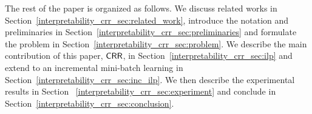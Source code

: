 The rest of the paper is organized as follows. We discuss related works in Section~\ref{interpretability_crr_sec:related_work}, introduce the notation and preliminaries in Section~\ref{interpretability_crr_sec:preliminaries} and formulate the problem in Section~\ref{interpretability_crr_sec:problem}. We describe the main contribution of this paper, $ \mathsf{CRR} $,  in Section~\ref{interpretability_crr_sec:ilp} and extend to an incremental mini-batch learning in Section~\ref{interpretability_crr_sec:inc_ilp}. We then describe the experimental results in Section ~\ref{interpretability_crr_sec:experiment} and conclude in Section~\ref{interpretability_crr_sec:conclusion}. 






